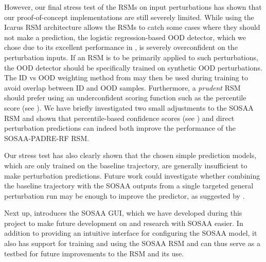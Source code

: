\newpar However, our final stress test of the RSMs on input perturbations has shown that our proof-of-concept implementations are still severely limited. While using the Icarus RSM architecture allows the RSMs to catch some cases where they should not make a prediction, the logistic regression-based OOD detector, which we chose due to its excellent performance in , is severely overconfident on the perturbation inputs. If an RSM is to be primarily applied to such perturbations, the OOD detector should be specifically trained on synthetic OOD perturbations. The ID vs OOD weighting method from  may then be used during training to avoid overlap between ID and OOD samples. Furthermore, a \textit{prudent} RSM should prefer using an underconfident scoring function such as the percentile score (see ). We have briefly investigated two small adjustments to the SOSAA RSM and shown that percentile-based confidence scores (see ) and direct perturbation predictions can indeed both improve the performance of the SOSAA-PADRE-RF RSM.

Our stress test has also clearly shown that the chosen simple prediction models, which are only trained on the baseline trajectory, are generally insufficient to make perturbation predictions. Future work could investigate whether combining the baseline trajectory with the SOSAA outputs from a single targeted general perturbation run may be enough to improve the predictor, as suggested by \textcite{deep-rsm-2020}.

\newpar Next up,  introduces the SOSAA GUI, which we have developed during this project to make future development on and research with SOSAA easier. In addition to providing an intuitive interface for configuring the SOSAA model, it also has support for training and using the SOSAA RSM and can thus serve as a testbed for future improvements to the RSM and its use.
